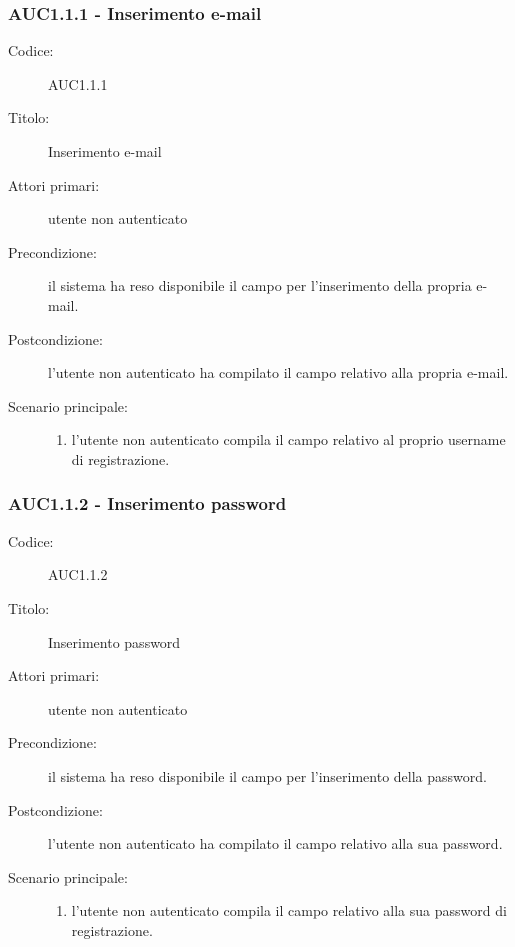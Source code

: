 \documentclass[casi-duso]{subfiles}
\begin{document}
\subsubsection{AUC1.1.1 - Inserimento e-mail}%
\label{subsub:AUC1.1.1}
\begin{description}
  \item[Codice:] AUC1.1.1
  \item[Titolo:] Inserimento e-mail
  \item[Attori primari:] utente non autenticato
  \item[Precondizione:] il sistema ha reso disponibile il campo per l'inserimento della propria e-mail.
  \item[Postcondizione:] l'utente non autenticato ha compilato il campo relativo alla propria e-mail.
  \item[Scenario principale:] 
  \begin{enumerate}
    \item l'utente non autenticato compila il campo relativo al proprio username di registrazione.
  \end{enumerate}
\end{description}

\subsubsection{AUC1.1.2 - Inserimento password}%
\label{subsub:AUC1.1.2}
\begin{description}
  \item[Codice:] AUC1.1.2
  \item[Titolo:] Inserimento password
  \item[Attori primari:] utente non autenticato
  \item[Precondizione:] il sistema ha reso disponibile il campo per l'inserimento della password.
  \item[Postcondizione:] l'utente non autenticato ha compilato il campo relativo alla sua password.
  \item[Scenario principale:]
  \begin{enumerate}
    \item l'utente non autenticato compila il campo relativo alla sua password di registrazione.
  \end{enumerate}
\end{description}
\end{document}
